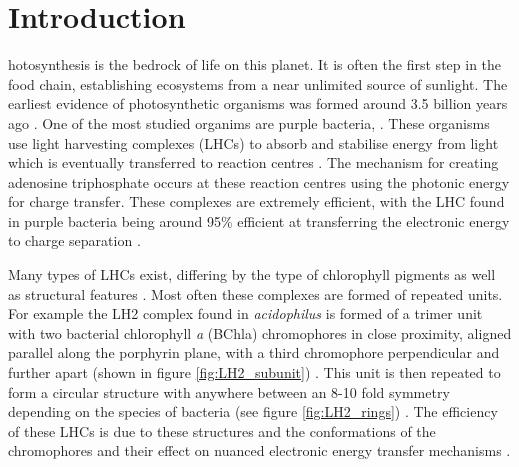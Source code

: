 %
%
\chapter{Introduction}
\label{chap:intro}

hotosynthesis is the bedrock of life on this planet. It is often the 
first step in the food chain, establishing ecosystems from a near unlimited source 
of sunlight. The earliest evidence of photosynthetic organisms was formed around
3.5 billion years ago \cite{Blankenship2010}. One of the most studied organims are
purple bacteria, \cite{Cogdell2021}. These organisms use light harvesting complexes 
(LHCs) to absorb and stabilise energy from light which is eventually transferred 
to reaction centres \cite{Klamt2008}. The mechanism for creating adenosine triphosphate
occurs at these reaction centres using the photonic energy for charge transfer.
These complexes are extremely efficient, with the LHC found in purple bacteria being
around 95\% efficient at transferring the electronic energy to charge separation \cite{Tretiak2000}.

Many types of LHCs exist, differing by the type of chlorophyll pigments as well 
as structural features . Most often these complexes are formed of repeated units.
For example the LH2 complex found in \emph{acidophilus} is formed of a trimer unit
with two bacterial chlorophyll \emph{a} (BChla) chromophores in close proximity, 
aligned parallel along the porphyrin plane, with a third chromophore perpendicular
and further apart (shown in figure \ref{fig:LH2_subunit}) \cite{Cogdell2006}. This
unit is then repeated to form a circular structure with anywhere between an 8-10 
fold symmetry depending on the species of bacteria (see figure \ref{fig:LH2_rings})
\cite{Mallus2018, Cleary2013}. The efficiency of these LHCs is due to these structures
and the conformations of the chromophores and their effect on nuanced electronic
energy transfer mechanisms \cite{Harel2012}.

